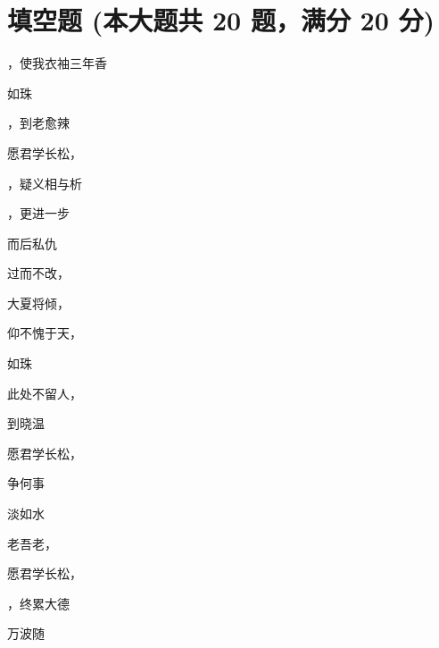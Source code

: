 \documentclass[12pt, a4paper, addpoints]{exam}
\begin{document}
\section{\normalsize{填空题 (本大题共 20 题，满分 20 分)}}
\hspace{1.5cm}
\begin{multicols}{2}
\begin{questions}
\question[1] \uline{\qquad\qquad\qquad}，使我衣袖三年香

\question[1] \uline{\qquad\qquad\qquad}如珠

\question[1] \uline{\qquad\qquad\qquad}，到老愈辣

\question[1] 愿君学长松，\uline{\qquad\qquad\qquad}

\question[1] \uline{\qquad\qquad\qquad}，疑义相与析

\question[1] \uline{\qquad\qquad\qquad}，更进一步

\question[1] \uline{\qquad\qquad\qquad}而后私仇

\question[1] 过而不改，\uline{\qquad\qquad\qquad}

\question[1] 大夏将倾，\uline{\qquad\qquad\qquad}

\question[1] 仰不愧于天，\uline{\qquad\qquad\qquad}

\question[1] \uline{\qquad\qquad\qquad}如珠

\question[1] 此处不留人，\uline{\qquad\qquad\qquad}

\question[1] \uline{\qquad\qquad\qquad}到晓温

\question[1] 愿君学长松，\uline{\qquad\qquad\qquad}

\question[1] \uline{\qquad\qquad\qquad}争何事

\question[1] \uline{\qquad\qquad\qquad}淡如水

\question[1] 老吾老，\uline{\qquad\qquad\qquad}

\question[1] 愿君学长松，\uline{\qquad\qquad\qquad}

\question[1] \uline{\qquad\qquad\qquad}，终累大德

\question[1] \uline{\qquad\qquad\qquad}万波随

\end{questions}
\end{multicols}
\end{document}
